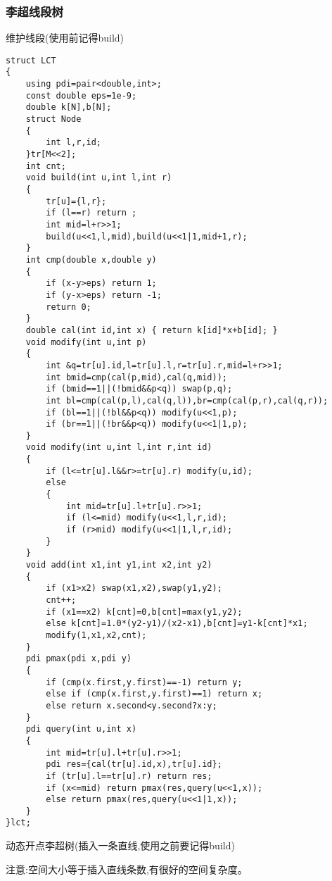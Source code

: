 \documentclass[a4paper]{ctexart}
\begin{document}
\subsubsection{李超线段树}
维护线段(使用前记得build)
\begin{lstlisting}
struct LCT
{
    using pdi=pair<double,int>;
    const double eps=1e-9;
    double k[N],b[N];
    struct Node
    {
        int l,r,id;
    }tr[M<<2];
    int cnt;
    void build(int u,int l,int r)
    {
        tr[u]={l,r};
        if (l==r) return ;
        int mid=l+r>>1;
        build(u<<1,l,mid),build(u<<1|1,mid+1,r);
    }
    int cmp(double x,double y)
    {
        if (x-y>eps) return 1;
        if (y-x>eps) return -1;
        return 0;
    }
    double cal(int id,int x) { return k[id]*x+b[id]; }
    void modify(int u,int p)
    {
        int &q=tr[u].id,l=tr[u].l,r=tr[u].r,mid=l+r>>1;
        int bmid=cmp(cal(p,mid),cal(q,mid));
        if (bmid==1||(!bmid&&p<q)) swap(p,q);
        int bl=cmp(cal(p,l),cal(q,l)),br=cmp(cal(p,r),cal(q,r));
        if (bl==1||(!bl&&p<q)) modify(u<<1,p);
        if (br==1||(!br&&p<q)) modify(u<<1|1,p);
    }
    void modify(int u,int l,int r,int id)
    {
        if (l<=tr[u].l&&r>=tr[u].r) modify(u,id);
        else
        {
            int mid=tr[u].l+tr[u].r>>1;
            if (l<=mid) modify(u<<1,l,r,id);
            if (r>mid) modify(u<<1|1,l,r,id);
        }
    }
    void add(int x1,int y1,int x2,int y2)
    {
        if (x1>x2) swap(x1,x2),swap(y1,y2);
        cnt++;
        if (x1==x2) k[cnt]=0,b[cnt]=max(y1,y2);
        else k[cnt]=1.0*(y2-y1)/(x2-x1),b[cnt]=y1-k[cnt]*x1;
        modify(1,x1,x2,cnt);
    }
    pdi pmax(pdi x,pdi y)
    {
        if (cmp(x.first,y.first)==-1) return y;
        else if (cmp(x.first,y.first)==1) return x;
        else return x.second<y.second?x:y;
    }
    pdi query(int u,int x)
    {
        int mid=tr[u].l+tr[u].r>>1;
        pdi res={cal(tr[u].id,x),tr[u].id};
        if (tr[u].l==tr[u].r) return res;
        if (x<=mid) return pmax(res,query(u<<1,x));
        else return pmax(res,query(u<<1|1,x));
    }
}lct;
\end{lstlisting}

动态开点李超树(插入一条直线,使用之前要记得build)

注意:空间大小等于插入直线条数,有很好的空间复杂度。
\end{document}
